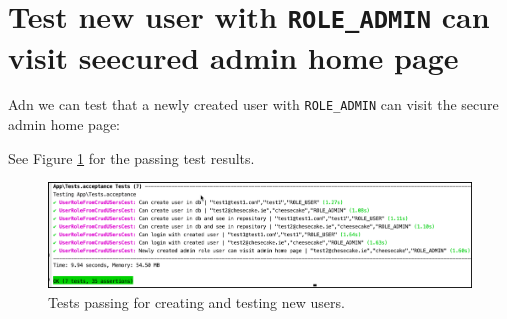 \documentclass[a4paperpaper,openright]{book}
\newenvironment{Shaded}{}{}
\newcommand{\AnnotationTok}[1]{\textcolor[rgb]{0.38,0.63,0.69}{\textbf{\textit{#1}}}}
\newcommand{\CommentTok}[1]{\textcolor[rgb]{0.38,0.63,0.69}{\textit{#1}}}
\newcommand{\CommentVarTok}[1]{\textcolor[rgb]{0.38,0.63,0.69}{\textbf{\textit{#1}}}}
\newcommand{\KeywordTok}[1]{\textcolor[rgb]{0.00,0.44,0.13}{\textbf{#1}}}
\newcommand{\NormalTok}[1]{#1}
\newcommand{\OtherTok}[1]{\textcolor[rgb]{0.00,0.44,0.13}{#1}}
\newcommand{\StringTok}[1]{\textcolor[rgb]{0.25,0.44,0.63}{#1}}
\begin{document}
\hypertarget{test-new-user-with-role_admin-can-visit-seecured-admin-home-page}{%
\section{\texorpdfstring{Test new user with \texttt{ROLE\_ADMIN} can
visit seecured admin home
page}{Test new user with ROLE\_ADMIN can visit seecured admin home page}}\label{test-new-user-with-role_admin-can-visit-seecured-admin-home-page}}

Adn we can test that a newly created user with \texttt{ROLE\_ADMIN} can
visit the secure admin home page:

\begin{Shaded}
\end{Shaded}

See Figure \ref{newUserTests} for the passing test results.

\begin{figure}
\centering
\includegraphics{./tex2pdf.-d01fd108a306454d/f1b6a171b6197e2e3bd9905c29ac3cfa83785099.png}
\caption{Tests passing for creating and testing new users.
\label{newUserTests}}
\end{figure}
\end{document}

